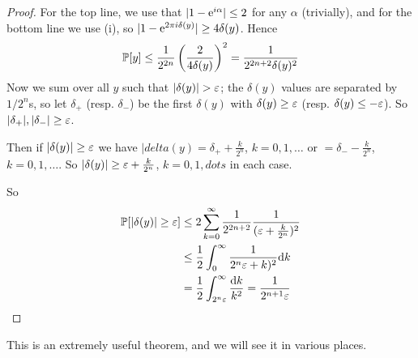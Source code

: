 \documentclass[]{article}
\begin{document}
\begin{proof}
	For the top line, we use that $|1 - \e^{i\alpha}| \le 2$ for any $\alpha$ (trivially), and for the bottom line we use (i), so $|1 - \e^{2\pi i\delta(y)}| \ge 4\delta(y)$. Hence
	\begin{align*}
		\P[y] \le \frac{1}{2^{2n}}\left(\frac{2}{4\delta(y)}\right)^2 = \frac{1}{2^{2n+2}\delta(y)^2}
	\end{align*}
	Now we sum over all $y$ such that $|\delta(y)| > \eps$; the $\delta(y)$ values are separated by $1/2^n$s, so let $\delta_+$ (resp. $\delta_-$) be the first $\delta(y)$ with $\delta(y)\ge \eps$ (resp. $\delta(y)\le -\eps$). So $|\delta_+|,|\delta_-|\ge \eps$.

	Then if $|\delta(y)| \ge \eps$ we have $|delta(y) = \delta_+ + \frac{k}{2^n}$, $k = 0,1,\dots$ or $=\delta_- - \frac{k}{2^n}$, $k = 0,1,\dots$. So $|\delta(y)|\ge \eps +\frac{k}{2^n}$, $k = 0,1,dots$ in each case.

	So
	\begin{align*}
		\P[|\delta(y)| \ge \eps] &\le 2\sum_{k=0}^{\infty}\frac{1}{2^{2n+2}}\frac{1}{(\eps+\frac{k}{2^{n}})^2}\\
		&\le \frac{1}{2}\int_{0}^{\infty}\frac{1}{2^n\eps + k)^2}\textrm{d}k\\
		&=\frac{1}{2}\int_{2^n\eps}^{\infty}\frac{\textrm{d}k}{k^2} = \frac{1}{2^{n+1}\eps}
	\end{align*}
\end{proof}

This is an extremely useful theorem, and we will see it in various places.
\end{document}
